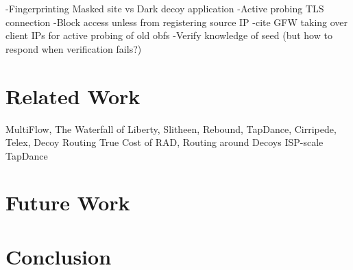 \documentclass[letterpaper,twocolumn,10pt]{article}
\begin{document}
-Fingerprinting Masked site vs Dark decoy application
-Active probing TLS connection
    -Block access unless from registering source IP
        -cite GFW taking over client IPs for active probing of old obfs
    -Verify knowledge of seed (but how to respond when verification fails?)

\section{Related Work}

MultiFlow, The Waterfall of Liberty, Slitheen, Rebound, TapDance, Cirripede, Telex, Decoy Routing
True Cost of RAD, Routing around Decoys
ISP-scale TapDance


\section{Future Work}

\section{Conclusion}

%



\end{document}
